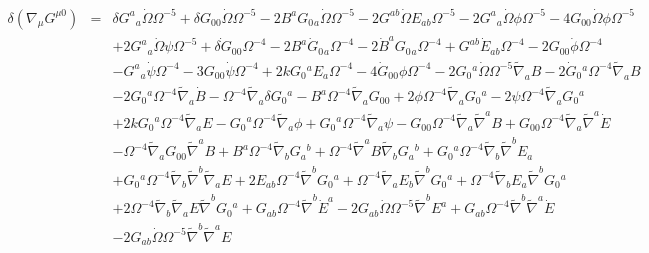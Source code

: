 \documentclass[10pt,letterpaper]{article}
\numberwithin{equation}{section}
\begin{document}
\begin{eqnarray}
\delta(\nabla_\mu G^{\mu 0})&=& \delta G^{a}{}_{a} \dot{\Omega} \Omega^{-5} + \delta G_{00}{} \dot{\Omega} \Omega^{-5} - 2 B^{a} G_{0}{}_{a} \dot{\Omega} \Omega^{-5} - 2 G^{ab} \dot{\Omega} E_{ab} \Omega^{-5} - 2 G^{a}{}_{a} \dot{\Omega} \phi \Omega^{-5} - 4 G_{00}{} \dot{\Omega} \phi \Omega^{-5} \nonumber \\ 
&& + 2 G^{a}{}_{a} \dot{\Omega} \psi \Omega^{-5} + \dot{\delta G}_{00}{} \Omega^{-4} - 2 B^{a} \dot{G}_{0}{}_{a} \Omega^{-4} - 2 \dot{B}^{a} G_{0}{}_{a} \Omega^{-4} + G^{ab} \dot{E}_{ab} \Omega^{-4} - 2 G_{00}{} \dot{\phi} \Omega^{-4} \nonumber \\ 
&& -  G^{a}{}_{a} \dot{\psi} \Omega^{-4} - 3 G_{00}{} \dot{\psi} \Omega^{-4} + 2 k G_{0}{}^{a} E_{a} \Omega^{-4} - 4 \dot{G}_{00}{} \phi \Omega^{-4} - 2 G_{0}{}^{a} \dot{\Omega} \Omega^{-5} \tilde{\nabla}_{a}B - 2 \dot{G}_{0}{}^{a} \Omega^{-4} \tilde{\nabla}_{a}B \nonumber \\ 
&& - 2 G_{0}{}^{a} \Omega^{-4} \tilde{\nabla}_{a}\dot{B} -  \Omega^{-4} \tilde{\nabla}_{a}\delta G_{0}{}^{a} -  B^{a} \Omega^{-4} \tilde{\nabla}_{a}G_{00}{} + 2 \phi \Omega^{-4} \tilde{\nabla}_{a}G_{0}{}^{a} - 2 \psi \Omega^{-4} \tilde{\nabla}_{a}G_{0}{}^{a} \nonumber \\ 
&& + 2 k G_{0}{}^{a} \Omega^{-4} \tilde{\nabla}_{a}E -  G_{0}{}^{a} \Omega^{-4} \tilde{\nabla}_{a}\phi + G_{0}{}^{a} \Omega^{-4} \tilde{\nabla}_{a}\psi -  G_{00}{} \Omega^{-4} \tilde{\nabla}_{a}\tilde{\nabla}^{a}B + G_{00}{} \Omega^{-4} \tilde{\nabla}_{a}\tilde{\nabla}^{a}\dot{E} \nonumber \\ 
&& -  \Omega^{-4} \tilde{\nabla}_{a}G_{00}{} \tilde{\nabla}^{a}B + B^{a} \Omega^{-4} \tilde{\nabla}_{b}G_{a}{}^{b} + \Omega^{-4} \tilde{\nabla}^{a}B \tilde{\nabla}_{b}G_{a}{}^{b} + G_{0}{}^{a} \Omega^{-4} \tilde{\nabla}_{b}\tilde{\nabla}^{b}E_{a} \nonumber \\ 
&& + G_{0}{}^{a} \Omega^{-4} \tilde{\nabla}_{b}\tilde{\nabla}^{b}\tilde{\nabla}_{a}E + 2 E_{ab} \Omega^{-4} \tilde{\nabla}^{b}G_{0}{}^{a} + \Omega^{-4} \tilde{\nabla}_{a}E_{b} \tilde{\nabla}^{b}G_{0}{}^{a} + \Omega^{-4} \tilde{\nabla}_{b}E_{a} \tilde{\nabla}^{b}G_{0}{}^{a} \nonumber \\ 
&& + 2 \Omega^{-4} \tilde{\nabla}_{b}\tilde{\nabla}_{a}E \tilde{\nabla}^{b}G_{0}{}^{a} + G_{ab} \Omega^{-4} \tilde{\nabla}^{b}\dot{E}^{a} - 2 G_{ab} \dot{\Omega} \Omega^{-5} \tilde{\nabla}^{b}E^{a} + G_{ab} \Omega^{-4} \tilde{\nabla}^{b}\tilde{\nabla}^{a}\dot{E} \nonumber \\ 
&& - 2 G_{ab} \dot{\Omega} \Omega^{-5} \tilde{\nabla}^{b}\tilde{\nabla}^{a}E

\end{eqnarray}
\end{document}
